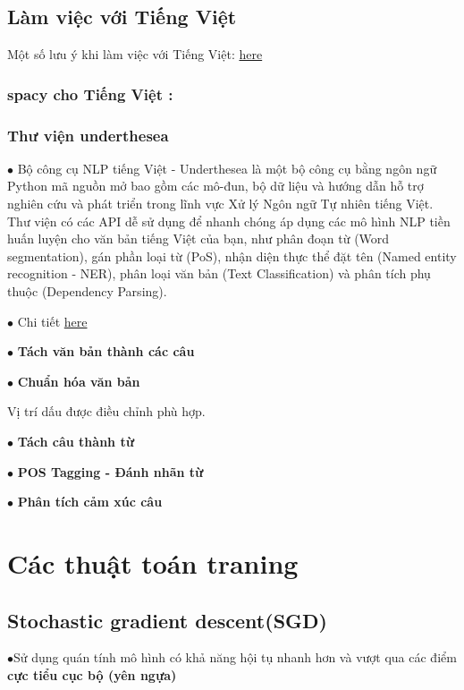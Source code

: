 \documentclass[final,letterpaper,twoside,12pt]{report}
\begin{document}
\section{Làm việc với Tiếng Việt}
Một số lưu ý khi làm việc với Tiếng Việt:
\href{https://universaldependencies.org/vi/index.html}{here}

\subsection{spacy cho Tiếng Việt :}


\subsection{Thư viện underthesea}

$\bullet$ Bộ công cụ NLP tiếng Việt - Underthesea là một bộ công cụ bằng ngôn ngữ Python mã nguồn mở bao gồm các mô-đun, bộ dữ liệu và hướng dẫn hỗ trợ nghiên cứu và phát triển trong lĩnh vực Xử lý Ngôn ngữ Tự nhiên tiếng Việt. Thư viện có các API dễ sử dụng để nhanh chóng áp dụng các mô hình NLP tiền huấn luyện cho văn bản tiếng Việt của bạn, như phân đoạn từ (Word segmentation), gán phần loại từ (PoS), nhận diện thực thể đặt tên (Named entity recognition - NER), phân loại văn bản (Text Classification) và phân tích phụ thuộc (Dependency Parsing).

$\bullet$ Chi tiết \href{https://github.com/undertheseanlp/underthesea}{here}

$\bullet$ \textbf{Tách văn bản thành các câu}



$\bullet$ \textbf{Chuẩn hóa văn bản}

Vị trí dấu được điều chỉnh phù hợp.

$\bullet$ \textbf{Tách câu thành từ}


$\bullet$ \textbf{POS Tagging - Đánh nhãn từ}


$\bullet$ \textbf{Phân tích cảm xúc câu}



\chapter{Các thuật toán traning}

\section{Stochastic gradient descent(SGD)}

$\bullet$Sử dụng quán tính mô hình có khả năng hội tụ nhanh hơn và vượt qua các điểm \textbf{\color{red}cực tiểu cục bộ (yên ngựa)}
\end{document}

